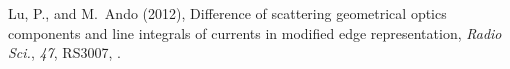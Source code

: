 \documentclass[draft,jgrga]{AGUTeX}
\begin{document}
\begin{article}
\begin{thebibliography}{}
Lu, P., and M.~Ando (2012), Difference of scattering geometrical optics
  components and line integrals of currents in modified edge representation,
  \textit{Radio Sci.}, \textit{47},  RS3007, .

\end{thebibliography}





\end{article}

\end{document}
